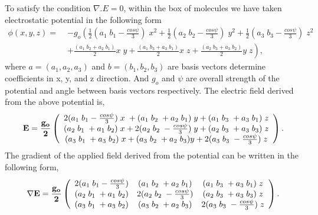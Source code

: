 To satisfy the condition $ \nabla . E = 0 $, within the box of molecules we have taken electrostatic potential in the following form
\begin{equation}
\begin{split}
\phi(x, y, z) =\; &-g_o \left(\frac{1}{2}(a_1\;b_1 - \frac{cos\psi}{3})\;x^2+\frac{1}{2}(a_2\;b_2 - \frac{cos\psi}{3})\;y^2 + \frac{1}{2}(a_3\;b_3 - \frac{cos\psi}{3})\;z^2 \right. \\
& \left. + \frac{(a_1\;b_2 + a_2\;b_1)}{2} x\;y + \frac{(a_1\;b_3 + a_3\;b_1)}{2} x\;z +  \frac{(a_2\;b_3 + a_3\;b_2)}{2} y\;z \right),
\end{split}
\label{eq:appliedPotential}
\end{equation} 
where $a = (a_1, a_2, a_3)$ and $b = (b_1, b_2, b_3)$ are basis vectors  determine coefficients in x, y, and z direction. And $g_o$ and $\psi$ are overall strength of the potential and angle between basis vectors respectively. The electric field derived from the above potential is,
\[\bf{E} 
=\frac{g_o}{2} \left(\begin{array}{ccc}
2(a_1\; b_1 - \frac{cos\psi}{3})\;x \;+  (a_1\; b_2 \;+ a_2\; b_1)\;y + (a_1\; b_3 \;+ a_3\; b_1)\;z \\
 (a_2\; b_1 \;+ a_1\; b_2)\;x + 2(a_2\; b_2 \;- \frac{cos\psi}{3})\;y +  (a_2\; b_3 \;+ a_3\; b_3)\;z \\
(a_3\; b_1 \;+ a_3\; b_2)\;x +  (a_3\; b_2 \;+ a_2\; b_3)y + 2(a_3\; b_3 \;- \frac{cos\psi}{3})\;z 
\end{array} \right).\] 
The gradient of the applied field derived from the potential can be written in the following form,
\[\nabla\bf{E} 
= \frac{g_o}{2}\left(\begin{array}{ccc}
2(a_1\; b_1 - \frac{cos\psi}{3}) &  (a_1\; b_2 \;+ a_2\; b_1) & (a_1\; b_3 \;+ a_3\; b_1)\;z \\
 (a_2\; b_1 \;+ a_1\; b_2) & 2(a_2\; b_2 \;- \frac{cos\psi}{3}) & (a_2\; b_3 \;+ a_3\; b_3)\;z \\
(a_3\; b_1 \;+ a_3\; b_2) & (a_3\; b_2 \;+ a_2\; b_3) & 2(a_3\; b_3 \;- \frac{cos\psi}{3})\;z 
\end{array} \right).\] 

%
% 
% 